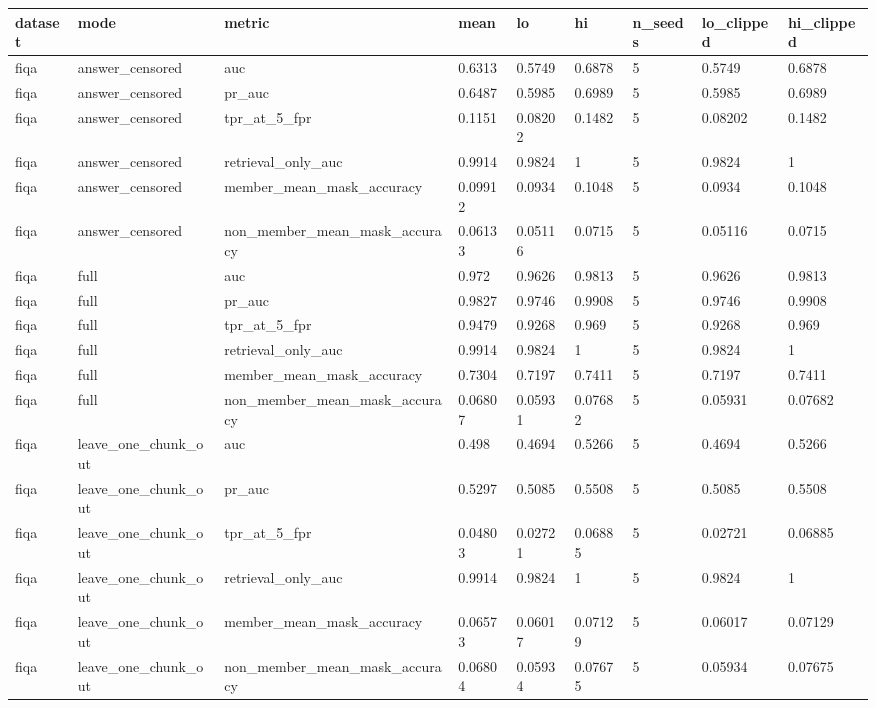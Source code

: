 \begin{tabular}{lllllllll}
\toprule
dataset & mode & metric & mean & lo & hi & n\_seeds & lo\_clipped & hi\_clipped \\
\midrule
fiqa & answer\_censored & auc & 0.6313 & 0.5749 & 0.6878 & 5 & 0.5749 & 0.6878 \\
fiqa & answer\_censored & pr\_auc & 0.6487 & 0.5985 & 0.6989 & 5 & 0.5985 & 0.6989 \\
fiqa & answer\_censored & tpr\_at\_5\_fpr & 0.1151 & 0.08202 & 0.1482 & 5 & 0.08202 & 0.1482 \\
fiqa & answer\_censored & retrieval\_only\_auc & 0.9914 & 0.9824 & 1 & 5 & 0.9824 & 1 \\
fiqa & answer\_censored & member\_mean\_mask\_accuracy & 0.09912 & 0.0934 & 0.1048 & 5 & 0.0934 & 0.1048 \\
fiqa & answer\_censored & non\_member\_mean\_mask\_accuracy & 0.06133 & 0.05116 & 0.0715 & 5 & 0.05116 & 0.0715 \\
fiqa & full & auc & 0.972 & 0.9626 & 0.9813 & 5 & 0.9626 & 0.9813 \\
fiqa & full & pr\_auc & 0.9827 & 0.9746 & 0.9908 & 5 & 0.9746 & 0.9908 \\
fiqa & full & tpr\_at\_5\_fpr & 0.9479 & 0.9268 & 0.969 & 5 & 0.9268 & 0.969 \\
fiqa & full & retrieval\_only\_auc & 0.9914 & 0.9824 & 1 & 5 & 0.9824 & 1 \\
fiqa & full & member\_mean\_mask\_accuracy & 0.7304 & 0.7197 & 0.7411 & 5 & 0.7197 & 0.7411 \\
fiqa & full & non\_member\_mean\_mask\_accuracy & 0.06807 & 0.05931 & 0.07682 & 5 & 0.05931 & 0.07682 \\
fiqa & leave\_one\_chunk\_out & auc & 0.498 & 0.4694 & 0.5266 & 5 & 0.4694 & 0.5266 \\
fiqa & leave\_one\_chunk\_out & pr\_auc & 0.5297 & 0.5085 & 0.5508 & 5 & 0.5085 & 0.5508 \\
fiqa & leave\_one\_chunk\_out & tpr\_at\_5\_fpr & 0.04803 & 0.02721 & 0.06885 & 5 & 0.02721 & 0.06885 \\
fiqa & leave\_one\_chunk\_out & retrieval\_only\_auc & 0.9914 & 0.9824 & 1 & 5 & 0.9824 & 1 \\
fiqa & leave\_one\_chunk\_out & member\_mean\_mask\_accuracy & 0.06573 & 0.06017 & 0.07129 & 5 & 0.06017 & 0.07129 \\
fiqa & leave\_one\_chunk\_out & non\_member\_mean\_mask\_accuracy & 0.06804 & 0.05934 & 0.07675 & 5 & 0.05934 & 0.07675 \\

\end{tabular}
